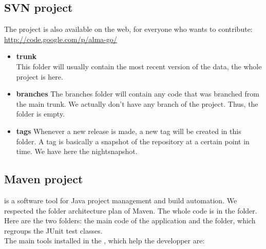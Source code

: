 \documentclass[a4paper,10pt]{report}
\newcommand{\empha}[1]{\textbf{\color{blue}{#1}}}
\begin{document}
			\subsection{SVN project}
				The project is also available on the web, for everyone who wants to contribute:  \href{http://code.google.com/p/alma-go/}{http://code.google.com/p/alma-go/}

					\begin{itemize}
						\item \textbf{trunk}\\
							This folder will usually contain the most recent version of the data, the whole project is here.
						\item \textbf{branches}
							The branches folder will contain any code that was branched from the main trunk. We actually don't have any branch of the project. Thus, the folder is empty.
						\item \textbf{tags}
							Whenever a new release is made, a new tag will be created in this folder. A tag is basically a snapshot of the repository at a certain point in time. We have here the nightsnapshot.
					\end{itemize}

			\subsection{Maven project}
				\empha{Maven} is a software tool for Java project management and build automation. We respected the folder architecture plan of Maven. The whole code is in the \empha{src} folder. Here are the two \empha{main} folders: the main code of the application and the \empha{test} folder, which regroups the JUnit test classes.
\\
				The main tools installed in the \empha{pom.xml}, which help the developper are:
\end{document}
